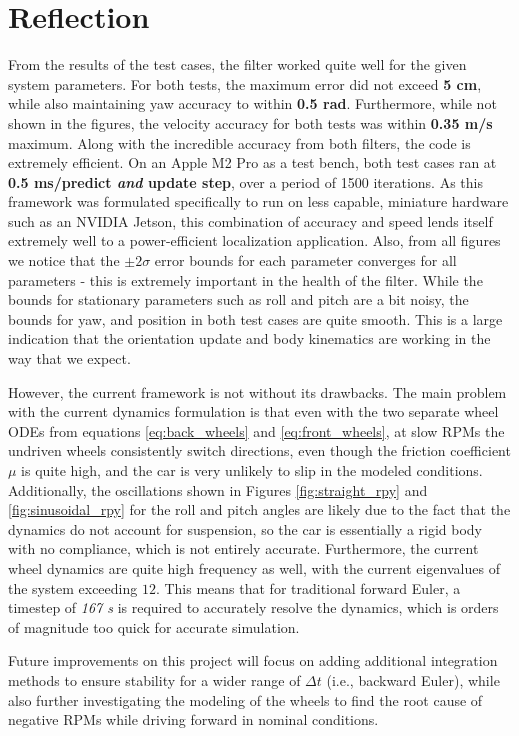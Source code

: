 \section{Reflection}

From the results of the test cases, the filter worked quite well for the given system parameters. For both tests, the maximum error did not exceed \textbf{5 cm}, while also maintaining yaw accuracy to within \textbf{0.5 rad}. Furthermore, while not shown in the figures, the velocity accuracy for both tests was within \textbf{0.35 m/s} maximum. Along with the incredible accuracy from both filters, the code is extremely efficient. On an Apple M2 Pro as a test bench, both test cases ran at \textbf{0.5 ms/predict \textit{and} update step}, over a period of 1500 iterations. As this framework was formulated specifically to run on less capable, miniature hardware such as an NVIDIA Jetson, this combination of accuracy and speed lends itself extremely well to a power-efficient localization application. Also, from all figures we notice that the $\pm 2\sigma$ error bounds for each parameter converges for all parameters - this is extremely important in the health of the filter. While the bounds for stationary parameters such as roll and pitch are a bit noisy, the bounds for yaw, and position in both test cases are quite smooth. This is a large indication that the orientation update and body kinematics are working in the way that we expect.

However, the current framework is not without its drawbacks. The main problem with the current dynamics formulation is that even with the two separate wheel ODEs from equations \eqref{eq:back_wheels} and \eqref{eq:front_wheels}, at slow RPMs the undriven wheels consistently switch directions, even though the friction coefficient $\mu$ is quite high, and the car is very unlikely to slip in the modeled conditions. Additionally, the oscillations shown in Figures \ref{fig:straight_rpy} and \ref{fig:sinusoidal_rpy} for the roll and pitch angles are likely due to the fact that the dynamics do not account for suspension, so the car is essentially a rigid body with no compliance, which is not entirely accurate. Furthermore, the current wheel dynamics are quite high frequency as well, with the current eigenvalues of the system exceeding $12$. This means that for traditional forward Euler, a timestep of \textit{167 \textmu s} is required to accurately resolve the dynamics, which is orders of magnitude too quick for accurate simulation. 

Future improvements on this project will focus on adding additional integration methods to ensure stability for a wider range of $\Delta t$ (i.e., backward Euler), while also further investigating the modeling of the wheels to find the root cause of negative RPMs while driving forward in nominal conditions.
